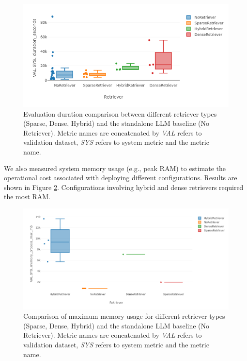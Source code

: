 \begin{figure}[!ht]
    \centering
    \includegraphics[width=\textwidth]{images/duration-retriever.png}
    \caption{Evaluation duration comparison between different retriever types (Sparse, Dense, Hybrid) and the standalone LLM baseline (No Retriever). Metric names are concatenated by \textit{VAL} refers to validation dataset, \textit{SYS} refers to system metric and the metric name.}
    \label{fig:evaluation-time}
\end{figure}

We also measured system memory usage (e.g., peak RAM) to estimate the operational cost associated with deploying different configurations. Results are shown in Figure \ref{fig:memory}. Configurations involving hybrid and dense retrievers required the most RAM.

\begin{figure}[!ht]
    \centering
    \includegraphics[width=\textwidth]{images/Max MB RAM.png}
    \caption{Comparison of maximum memory usage for different retriever types (Sparse, Dense, Hybrid) and the standalone LLM baseline (No Retriever). Metric names are concatenated by \textit{VAL} refers to validation dataset, \textit{SYS} refers to system metric and the metric name.}
    \label{fig:memory}
\end{figure}

